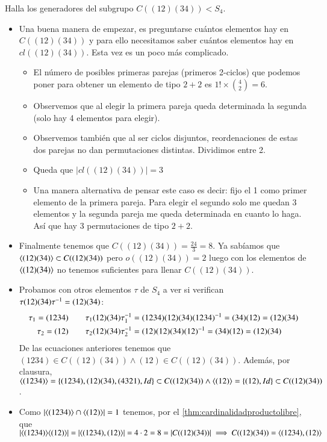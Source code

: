 \begin{ej}
	Halla los generadores del subgrupo $C((12)(34)) < S_4$.
	
	\begin{itemize}
		\item Una buena manera de empezar, es preguntarse cuántos elementos hay en $C((12)(34))$ y para ello necesitamos saber cuántos elementos hay en $cl((12)(34))$. Esta vez es un poco más complicado.
		\begin{itemize}
			\item El número de posibles primeras parejas (primeros 2-ciclos) que podemos poner para obtener un elemento de tipo $2+2$ es $1! \times \binom{4}{2} = 6$.
			\item Observemos que al elegir la primera pareja queda determinada la segunda (solo hay 4 elementos para elegir).
			\item Observemos también que al ser ciclos disjuntos, reordenaciones de estas dos parejas no dan permutaciones distintas. Dividimos entre 2.
			\item Queda que $|cl((12)(34))| = 3$
			\item Una manera alternativa de pensar este caso es decir: fijo el 1 como primer elemento de la primera pareja. Para elegir el segundo solo me quedan 3 elementos y la segunda pareja me queda determinada en cuanto lo haga. Así que hay 3 permutaciones de tipo $2+2$.
		\end{itemize}
		\item Finalmente tenemos que $C((12)(34)) = \frac{24}{3} = 8$. Ya sabíamos que $\langle(12)(34)\rangle \subset C((12)(34))$ pero $o((12)(34)) = 2$ luego con los elementos de $\langle(12)(34)\rangle$ no tenemos suficientes para llenar $C((12)(34))$.
		
		\item Probamos con otros elementos $\tau$ de $S_4$ a ver si verifican $\tau(12)(34)\tau^{-1} = (12)(34)$:
		\begin{align*}
			\tau_1 = (1234)\qquad &\tau_1(12)(34)\tau_1^{-1} = (1234)(12)(34)(1234)^{-1} = (34)(12) = (12)(34)\\
			\tau_2 = (12)\qquad &\tau_2 (12)(34)\tau_2^{-1} = (12)(12)(34)(12)^{-1} = (34)(12) = (12)(34)
		\end{align*}
		De las ecuaciones anteriores tenemos que $(1234) \in C((12)(34)) \land (12) \in C((12)(34))$. Además, por clausura, $\langle(1234)\rangle = \{(1234), (12)(34), (4321), Id\} \subset C((12)(34)) \land \langle(12)\rangle = \{(12), Id\} \subset C((12)(34))$.
		\item Como $|\langle(1234)\rangle\cap \langle(12)\rangle| = 1$ tenemos, por el \autoref{thm:cardinalidadproductolibre}, que $|\langle(1234)\rangle\langle(12)\rangle| = |\langle(1234), (12)\rangle| = 4 \cdot 2 = 8 = |C((12)(34))| \implies C((12)(34)) = \langle(1234), (12)\rangle$ 
	\end{itemize}
\end{ej}

